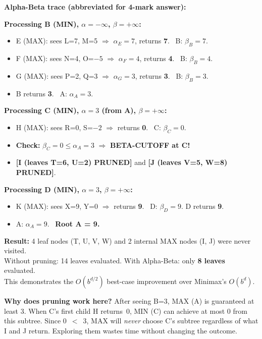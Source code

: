 \documentclass[12pt, a4paper]{article}
\newenvironment{answerbox}{\begin{mdframed}[style=answerframe]}{\end{mdframed}}
\newenvironment{notesbox}{\begin{mdframed}[style=notesframe]}{\end{mdframed}}
\newcommand{\pruned}[1]{\textcolor{prunered}{\textbf{[#1 PRUNED]}}}
\begin{document}
\begin{answerbox}
\textbf{Alpha-Beta trace (abbreviated for 4-mark answer):}

\medskip
\textbf{Processing B (MIN), $\alpha{=}{-}\infty$, $\beta{=}{+}\infty$:}
\begin{itemize}[noitemsep]
  \item E (MAX): sees L=7, M=5 $\Rightarrow$ $\alpha_E{=}7$, returns \textbf{7}. \ B: $\beta_B{=}7$.
  \item F (MAX): sees N=4, O=$-5$ $\Rightarrow$ $\alpha_F{=}4$, returns \textbf{4}. \ B: $\beta_B{=}4$.
  \item G (MAX): sees P=2, Q=3 $\Rightarrow$ $\alpha_G{=}3$, returns \textbf{3}. \ B: $\beta_B{=}3$.
  \item B returns \textbf{3}. \ A: $\alpha_A{=}3$.
\end{itemize}

\medskip
\textbf{Processing C (MIN), $\alpha{=}3$ (from A), $\beta{=}{+}\infty$:}
\begin{itemize}[noitemsep]
  \item H (MAX): sees R=0, S=$-2$ $\Rightarrow$ returns \textbf{0}. \ C: $\beta_C{=}0$.
  \item \textbf{Check:} $\beta_C = 0 \leq \alpha_A = 3$ \quad $\Rightarrow$ \textbf{BETA-CUTOFF at C!}
  \item \pruned{I (leaves T=6, U=2)} and \pruned{J (leaves V=5, W=8)}.
\end{itemize}

\medskip
\textbf{Processing D (MIN), $\alpha{=}3$, $\beta{=}{+}\infty$:}
\begin{itemize}[noitemsep]
  \item K (MAX): sees X=9, Y=0 $\Rightarrow$ returns \textbf{9}. \ D: $\beta_D{=}9$. D returns \textbf{9}.
  \item A: $\alpha_A{=}9$. \ \textbf{Root A = 9.}
\end{itemize}

\medskip
\textbf{Result:} 4 leaf nodes (T, U, V, W) and 2 internal MAX nodes (I, J) were never visited.\\
Without pruning: 14 leaves evaluated. With Alpha-Beta: only \textbf{8 leaves} evaluated.\\
This demonstrates the $O(b^{d/2})$ best-case improvement over Minimax's $O(b^d)$.
\end{answerbox}

\begin{notesbox}
\textbf{Why does pruning work here?} After seeing B=3, MAX (A) is guaranteed at least 3. When C's first child H returns~0, MIN (C) can achieve at most 0 from this subtree. Since 0~$<$~3, MAX will \textit{never} choose C's subtree regardless of what I and J return. Exploring them wastes time without changing the outcome.
\end{notesbox}
\end{document}
